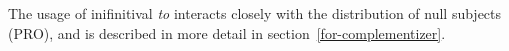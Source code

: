 
The usage of inifinitival {\em to} interacts closely with the distribution of
null subjects (PRO), and is described in more detail in
section~\ref{for-complementizer}.






